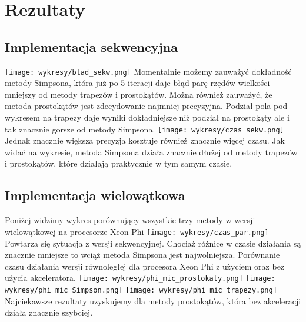 \documentclass {report}
\begin{document}
\section {Rezultaty}
\subsection {Implementacja sekwencyjna}
\texttt{[image: wykresy/blad\_sekw.png]}
\newline
Momentalnie możemy zauważyć dokładność metody Simpsona, która już po 5 iteracji daje błąd parę rzędów wielkości mniejszy od metody trapezów i prostokątów. Można również zauważyć, że metoda prostokątów jest zdecydowanie najmniej precyzyjna. Podział pola pod wykresem na trapezy daje wyniki dokładniejsze niż podział na prostokąty ale i tak znacznie gorsze od metody Simpsona.
\newline
\texttt{[image: wykresy/czas\_sekw.png]}
\newline
Jednak znacznie większa precyzja kosztuje również znacznie więcej czasu. Jak widać na wykresie, metoda Simpsona działa znacznie dłużej od metody trapezów i prostokątów, które działają praktycznie w tym samym czasie.
\subsection {Implementacja wielowątkowa}
Poniżej widzimy wykres porównujący wszystkie trzy metody w wersji wielowątkowej na procesorze Xeon Phi
\newline
\texttt{[image: wykresy/czas\_par.png]}
\newline
Powtarza się sytuacja z wersji sekwencyjnej. Chociaż różnice w czasie działania są znacznie mniejsze to wciąż metoda Simpsona jest najwolniejsza.
\newline
Porównanie czasu działania wersji równoległej dla procesora Xeon Phi z użyciem oraz bez użycia akceleratora.
\newline
\texttt{[image: wykresy/phi\_mic\_prostokaty.png]}
\newline
\texttt{[image: wykresy/phi\_mic\_Simpson.png]}
\newline
\texttt{[image: wykresy/phi\_mic\_trapezy.png]}
\newline
Najciekawsze rezultaty uzyskujemy dla metody prostokątów, która bez akceleracji działa znacznie szybciej.
\end{document}
